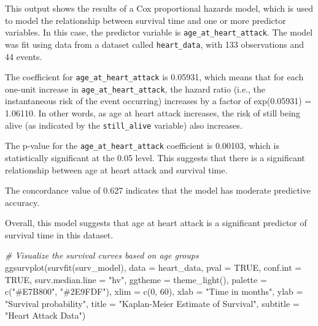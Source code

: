 \documentclass[
]{article}
\newenvironment{Shaded}{\begin{snugshade}}{\end{snugshade}}
\newcommand{\AttributeTok}[1]{\textcolor[rgb]{0.77,0.63,0.00}{#1}}
\newcommand{\CommentTok}[1]{\textcolor[rgb]{0.56,0.35,0.01}{\textit{#1}}}
\newcommand{\ConstantTok}[1]{\textcolor[rgb]{0.00,0.00,0.00}{#1}}
\newcommand{\DecValTok}[1]{\textcolor[rgb]{0.00,0.00,0.81}{#1}}
\newcommand{\FunctionTok}[1]{\textcolor[rgb]{0.00,0.00,0.00}{#1}}
\newcommand{\NormalTok}[1]{#1}
\newcommand{\StringTok}[1]{\textcolor[rgb]{0.31,0.60,0.02}{#1}}
\begin{document}
This output shows the results of a Cox proportional hazards model, which
is used to model the relationship between survival time and one or more
predictor variables. In this case, the predictor variable is
\texttt{age\_at\_heart\_attack}. The model was fit using data from a
dataset called \texttt{heart\_data}, with 133 observations and 44
events.

The coefficient for \texttt{age\_at\_heart\_attack} is 0.05931, which
means that for each one-unit increase in
\texttt{age\_at\_heart\_attack}, the hazard ratio (i.e., the
instantaneous risk of the event occurring) increases by a factor of
exp(0.05931) = 1.06110. In other words, as age at heart attack
increases, the risk of still being alive (as indicated by the
\texttt{still\_alive} variable) also increases.

The p-value for the \texttt{age\_at\_heart\_attack} coefficient is
0.00103, which is statistically significant at the 0.05 level. This
suggests that there is a significant relationship between age at heart
attack and survival time.

The concordance value of 0.627 indicates that the model has moderate
predictive accuracy.

Overall, this model suggests that age at heart attack is a significant
predictor of survival time in this dataset.

\begin{Shaded}
\begin{Highlighting}[]
\CommentTok{\# Visualize the survival curves based on age groups}
\FunctionTok{ggsurvplot}\NormalTok{(}\FunctionTok{survfit}\NormalTok{(surv\_model), }\AttributeTok{data =}\NormalTok{ heart\_data, }\AttributeTok{pval =} \ConstantTok{TRUE}\NormalTok{,}
           \AttributeTok{conf.int =} \ConstantTok{TRUE}\NormalTok{,}
  \AttributeTok{surv.median.line =} \StringTok{"hv"}\NormalTok{,}
  \AttributeTok{ggtheme =} \FunctionTok{theme\_light}\NormalTok{(),}
  \AttributeTok{palette =} \FunctionTok{c}\NormalTok{(}\StringTok{"\#E7B800"}\NormalTok{, }\StringTok{"\#2E9FDF"}\NormalTok{),}
  \AttributeTok{xlim =} \FunctionTok{c}\NormalTok{(}\DecValTok{0}\NormalTok{, }\DecValTok{60}\NormalTok{),}
  \AttributeTok{xlab =} \StringTok{"Time in months"}\NormalTok{,}
  \AttributeTok{ylab =} \StringTok{"Survival probability"}\NormalTok{,}
  \AttributeTok{title =} \StringTok{"Kaplan{-}Meier Estimate of Survival"}\NormalTok{,}
  \AttributeTok{subtitle =} \StringTok{"Heart Attack Data"}\NormalTok{)}
\end{Highlighting}
\end{Shaded}
\end{document}
